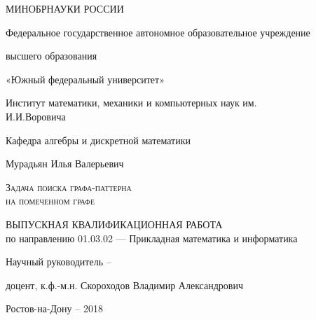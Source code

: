 \begin{center}
{ \bfseries

\large{МИНОБРНАУКИ РОССИИ}

\vspace{1cm}

\large{Федеральное государственное автономное образовательное 
	учреждение}

\large{высшего образования}

\large{«Южный федеральный университет»}

\vspace{1cm}

\large{Институт математики, механики и компьютерных наук им.\\ И.И.Воровича}
 
\large{Кафедра алгебры и дискретной математики}

\vspace{2cm}

\large{Мурадьян Илья Валерьевич}

\vspace{2cm}

\LARGE{\textsc{Задача поиска графа-паттерна\\ на помеченном графе}}

\vspace{2cm}

\large{ВЫПУСКНАЯ КВАЛИФИКАЦИОННАЯ РАБОТА\\
}
\large{по направлению 01.03.02 — Прикладная математика и информатика}
\vspace{2cm}

 
\large{ 
Научный руководитель -- 

доцент,  к.ф.-м.н. Скороходов Владимир Александрович
}

\vspace{3cm}

Ростов-на-Дону -- 2018
}
\end{center}
\thispagestyle{empty}
\pagebreak